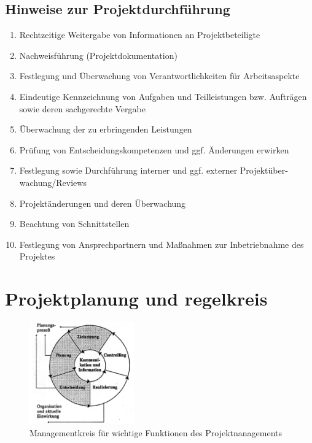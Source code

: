 \documentclass[11pt,a4paper]{article}
\begin{document}
\subsection{Hinweise zur Projektdurchführung}
\begin{enumerate}
\item Rechtzeitige Weitergabe von Informationen an Projektbeteiligte
\item Nachweisführung (Projektdokumentation)
\item Festlegung und Überwachung von Verantwortlichkeiten für Arbeitsaspekte
\item Eindeutige Kennzeichnung von Aufgaben und Teilleistungen bzw.
Aufträgen sowie deren sachgerechte Vergabe
\item Überwachung der zu erbringenden Leistungen
\item Prüfung von Entscheidungskompetenzen und ggf. Änderungen erwirken
\item Festlegung sowie Durchführung interner und ggf. externer Projektüber-
wachung/Reviews
\item Projektänderungen und deren Überwachung
\item Beachtung von Schnittstellen
\item Festlegung von Ansprechpartnern und Maßnahmen
zur Inbetriebnahme des Projektes
\end{enumerate}


\section{Projektplanung und regelkreis}

\begin{figure}[H]
	\centering

	\includegraphics[width=0.4\textwidth]{ch8/managementkreis}
	\caption*{Managementkreis für wichtige Funktionen des Projektnanagements}
\end{figure}
\end{document}
